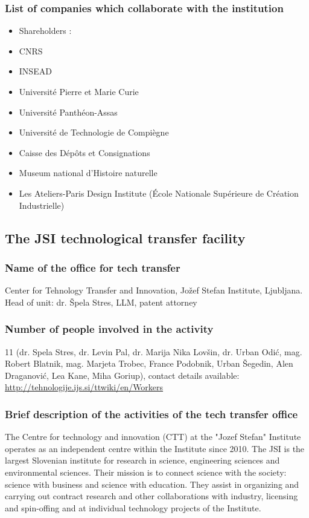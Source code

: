 \documentclass[12pt,a4paper,twoside]{article}
\begin{document}
\subsubsection{List of companies which collaborate with the institution}
\begin{itemize}
\item  Shareholders :
\item CNRS
\item INSEAD
\item Université Pierre et Marie Curie
\item Université Panthéon-Assas
\item Université de Technologie de Compiègne
\item Caisse des Dépôts et Consignations
\item Museum national d’Histoire naturelle
\item Les Ateliers-Paris Design Institute (École Nationale Supérieure de Création Industrielle)
\end{itemize}
 
\subsection{The JSI technological transfer facility}

\subsubsection{Name of the office for tech transfer}
Center for Tehnology Transfer and Innovation, Jožef Stefan Institute, Ljubljana. Head of unit: dr. Špela Stres, LLM, patent attorney 
\subsubsection{Number of people involved in the activity}

11 (dr. Spela Stres, dr. Levin Pal, dr. Marija Nika Lovšin, dr. Urban Odić, mag. Robert Blatnik, mag. Marjeta Trobec, France Podobnik, Urban Šegedin, Alen Draganović, Lea Kane, Miha Goriup), contact details available: \url{http://tehnologije.ijs.si/ttwiki/en/Workers}

\subsubsection{Brief description of the activities of the tech transfer office}
The Centre for technology and innovation (CTT) at the "Jozef Stefan" Institute operates as an independent centre within the Institute since 2010. The JSI is the largest Slovenian institute for research in science, engineering sciences and environmental sciences. Their mission is to connect science with the society: science with business and science with education. They assist in organizing and carrying out contract research and other collaborations with industry, licensing and spin-offing and at individual technology projects of the Institute.
\end{document}
